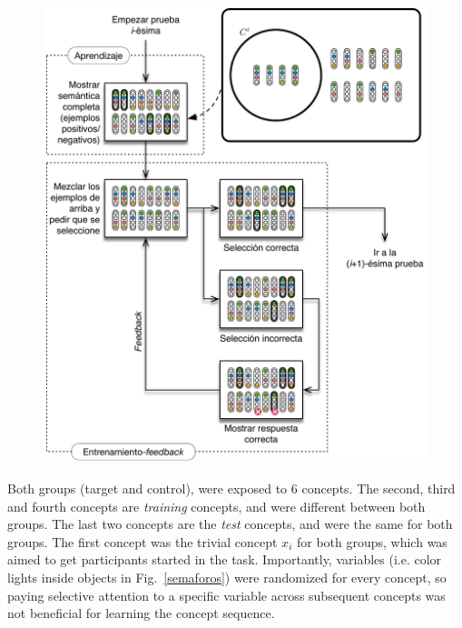 \begin{figure}
\begin{center}
  \includegraphics[scale=1]{../figuras/pre/experimento_PRE.pdf}
\end{center}\caption{}
\end{figure}

Both groups (target and control), were exposed to 6 concepts. The second, third and fourth concepts are {\em training} concepts, and were different between both groups. The last two concepts are the {\em test} concepts, and were the same for both groups. The first concept was the trivial concept $x_i$ for both groups, which was aimed to get participants started in the task. Importantly, variables (i.e. color lights inside objects in Fig.~\ref{semaforos}) were randomized for every concept, so paying selective attention to a specific variable across subsequent concepts was not beneficial for learning the concept sequence.


